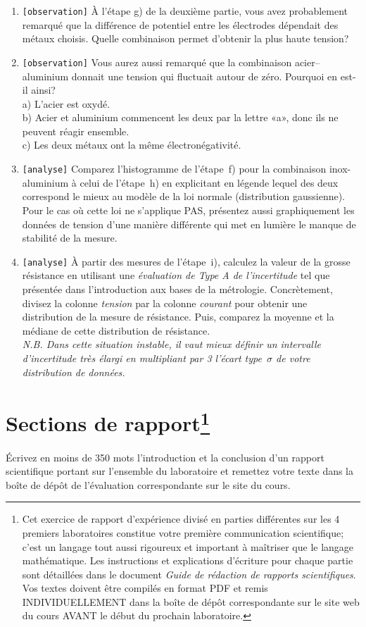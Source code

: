\documentclass[canadien,12pt,oneside,letterpaper]{article}
\begin{document}
\begin{enumerate}
\item \texttt{[observation]} À l'étape g) de la deuxième partie, vous avez probablement remarqué que la différence de potentiel entre les électrodes dépendait des métaux choisis. Quelle combinaison permet d'obtenir la plus haute tension?
\item \texttt{[observation]} Vous aurez aussi remarqué que la combinaison acier--aluminium donnait une tension qui fluctuait autour de zéro. Pourquoi en est-il ainsi?\\a) L'acier est oxydé.\\b) Acier et aluminium commencent les deux par la lettre «a», donc ils ne peuvent réagir ensemble.\\c) Les deux métaux ont la même électronégativité.
\item \texttt{[analyse]} Comparez l’histogramme de l’étape~f) pour la combinaison inox-aluminium à celui de l’étape~h) en explicitant en légende lequel des deux correspond le mieux au modèle de la loi normale (distribution gaussienne). Pour le cas où cette loi ne s’applique PAS, présentez aussi graphiquement les données de tension d'une manière différente qui met en lumière le manque de stabilité de la mesure.
\item \texttt{[analyse]} À partir des mesures de l'étape~i), calculez la valeur de la grosse résistance en utilisant une \textit{évaluation de Type A de l'incertitude} tel que présentée dans l’introduction aux bases de la métrologie. Concrètement, divisez la colonne \textit{tension} par la colonne \textit{courant} pour obtenir une distribution de la mesure de résistance. Puis, comparez la moyenne et la médiane de cette distribution de résistance.\\ \textit{N.B. Dans cette situation instable, il vaut mieux définir un intervalle d'incertitude très élargi en multipliant par 3 l'écart type~$\sigma$ de votre distribution de données.}
\end{enumerate}

\section[]{Sections de rapport\footnote{Cet exercice de rapport d'expérience divisé en parties différentes sur les 4 premiers laboratoires constitue votre première communication scientifique; c'est un langage tout aussi rigoureux et important à maîtriser que le langage mathématique. Les instructions et explications d'écriture pour chaque partie sont détaillées dans le document \textit{Guide de rédaction de rapports scientifiques}. Vos textes doivent être compilés en format PDF et remis INDIVIDUELLEMENT dans la boîte de dépôt correspondante sur le site web du cours AVANT le début du prochain laboratoire.}}

Écrivez en moins de 350 mots l'introduction et la conclusion d'un rapport scientifique portant sur l'ensemble du laboratoire et remettez votre texte dans la boîte de dépôt de l'évaluation correspondante sur le site du cours.
\end{document}
